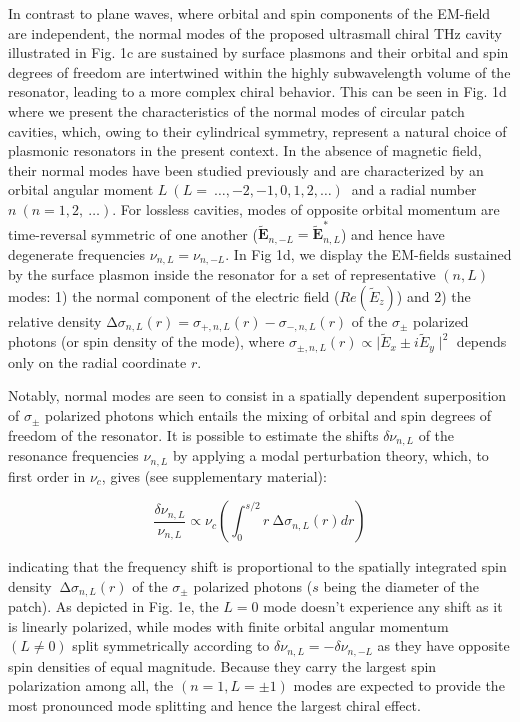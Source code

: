 \documentclass[twocolumn]{article}
\begin{document}
\noindent In contrast to plane waves, where orbital and spin components of the EM-field are independent, the normal modes of the proposed ultrasmall chiral THz cavity illustrated in Fig. 1c are sustained by surface plasmons and their orbital and spin degrees of freedom are intertwined within the highly subwavelength volume of the resonator, leading to a more complex chiral behavior. This can be seen in Fig. 1d where we present the characteristics of the normal modes of circular patch cavities, which, owing to their cylindrical symmetry, represent a natural choice of plasmonic resonators in the present context. In the absence of magnetic field, their normal modes have been studied previously \cite{Minkowski_2014} and are characterized by an orbital angular moment $L\ (L=\ \dots ,-2,-1,0,1,2,\dots )\ $ and a radial number $n\ (n=1,2,\ \dots )$. For lossless cavities, modes of opposite orbital momentum are time-reversal symmetric of one another (${\widetilde{\boldsymbol{E}}}_{n,-L}\boldsymbol{=}{\widetilde{\boldsymbol{E}}}^{\boldsymbol{*}}_{n,L}$) and hence have degenerate frequencies ${\nu }_{n,L}={\nu }_{n,-L}$. In Fig 1d, we display the EM-fields sustained by the surface plasmon inside the resonator for a set of representative $(n,L)$ modes: 1) the normal component of the electric field  ($Re(\tilde{E}_z)$)  and 2) the relative density $\mathrm{\Delta }{\sigma }_{n,L}\left(r\right)={\sigma }_{+,n,L}\left(r\right)-{\sigma }_{-,n,L}\left(r\right)$ of the ${\sigma }_{\pm }$ polarized photons (or spin density of the mode), where ${\sigma }_{\pm,n,L}\left(r\right)\propto \mid \tilde{E}_x \pm i\tilde{E}_y \mid ^2$ depends only on the radial coordinate $r$. 

\noindent Notably, normal modes are seen to consist in a spatially dependent superposition of ${\sigma }_{\pm }$ polarized photons which entails the mixing of orbital and spin degrees of freedom of the resonator. It is possible to estimate the shifts $\delta {\nu }_{n,L}$ of the resonance frequencies ${\nu }_{n,L}$ by applying a modal perturbation theory, which, to first order in ${\nu }_c$, gives (see supplementary material):

\noindent 
\[\frac{\delta {\nu }_{n,L}}{{\nu }_{n,L}}\propto {\nu }_c\left(\int^{s/2}_0{r{\mathrm{\ }\mathrm{\Delta }\sigma }_{n,L}\left(r\right)dr}\right)\] 

\noindent indicating that the frequency shift is proportional to the spatially integrated spin density ${\mathrm{\ }\mathrm{\Delta }\sigma }_{n,L}\left(r\right)$ of the ${\sigma }_{\pm }$ polarized photons ($s$ being the diameter of the patch). As depicted in Fig. 1e, the $L=0$ mode doesn't experience any shift as it is linearly polarized, while modes with finite orbital angular momentum $(L\neq 0)$ split symmetrically according to $\delta {\nu }_{n,L}=-\delta {\nu }_{n,-L}$ as they have opposite spin densities of equal magnitude. Because they carry the largest spin polarization among all, the $(n=1, L=\pm 1)$ modes are expected to provide the most pronounced mode splitting and hence the largest chiral effect. 
\end{document}

